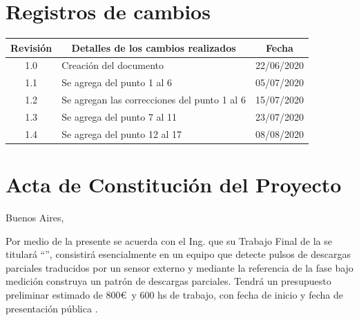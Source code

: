 \documentclass[11pt]{charter}
\begin{document}
\maketitle
\thispagestyle{empty}
\pagebreak


\thispagestyle{empty}
{\setlength{\parskip}{0pt}
\tableofcontents{}
}
\pagebreak


\section{Registros de cambios}
\label{sec:registro}


\begin{table}[ht]
\label{tab:registro}
\centering

\begin{tabularx}{\linewidth}{@{}|c|X|c|@{}}
\hline
\rowcolor[HTML]{C0C0C0} 
Revisión & \multicolumn{1}{c|}{\cellcolor[HTML]{C0C0C0}Detalles de los cambios realizados} & Fecha      \\ \hline
1.0      & 	Creación del documento     							& 22/06/2020 \\ \hline
1.1      & 	Se agrega del punto 1 al 6	 						& 05/07/2020 \\ \hline
1.2      & 	Se agregan las correcciones del punto 1 al 6		& 15/07/2020 \\ \hline
1.3      & 	Se agrega del punto 7 al 11							& 23/07/2020 \\ \hline
1.4      & 	Se agrega del punto 12 al 17						& 08/08/2020 \\ \hline
\end{tabularx}
\end{table}

\pagebreak



\section{Acta de Constitución del Proyecto}
\label{sec:acta}

\begin{flushright}
Buenos Aires, \fechaInicioName
\end{flushright}

\vspace{2 cm}

Por medio de la presente se acuerda con el Ing. \authorname\hspace{1px} que su Trabajo Final de la \degreename\hspace{1px} se titulará ``\ttitle'', consistirá esencialmente en un equipo que detecte pulsos de descargas parciales traducidos por un sensor externo y mediante la referencia de la fase bajo medición construya un patrón de descargas parciales. Tendrá un presupuesto preliminar estimado de 800\euro\ y 600 hs de trabajo, con fecha de inicio \fechaInicioName\hspace{1px} y fecha de presentación pública \fechaFinalName.
\end{document}
